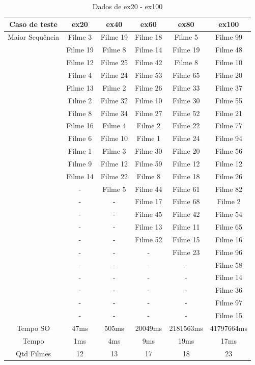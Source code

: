 \documentclass[12pt]{article}
\begin{document}
\begin{table}[H]

\centering

\begin{tabular}{|c|c|c|c|c|c|}

\hline
Caso de teste & ex20 & ex40 & ex60 & ex80 & ex100 \\
\hline
Maior Sequência & Filme 3 & Filme 19 & Filme 18 & Filme 5 & Filme 99 \\
\cline{2-6}
& Filme 19 & Filme 8 & Filme 14 & Filme 19 & Filme 48\\
\cline{2-6}
& Filme 12 & Filme 25 & Filme 42 & Filme 8 & Filme 10\\
\cline{2-6}
& Filme 4 & Filme 24 & Filme 53 & Filme 65 & Filme 20\\
\cline{2-6}
& Filme 13 & Filme 2 & Filme 26 & Filme 33 & Filme 37\\
\cline{2-6}
& Filme 2 & Filme 32 & Filme 10 & Filme 30 & Filme 55\\
\cline{2-6}
& Filme 8 & Filme 34 & Filme 27 & Filme 52 & Filme 21\\
\cline{2-6}
& Filme 16 & Filme 4 & Filme 2 & Filme 22 & Filme 77\\
\cline{2-6}
& Filme 6 & Filme 10 & Filme 1 & Filme 24 & Filme 94\\
\cline{2-6}
& Filme 1 & Filme 3 & Filme 30 & Filme 20 & Filme 56\\
\cline{2-6}
& Filme 9 & Filme 12 & Filme 59 & Filme 12 & Filme 12\\
\cline{2-6}
& Filme 14 & Filme 22 & Filme 8 & Filme 18 & Filme 26\\
\cline{2-6}
& - & Filme 5 & Filme 44 & Filme 61 & Filme 82\\
\cline{2-6}
& - & - & Filme 17 & Filme 68 & Filme 2\\
\cline{2-6}
& - & - & Filme 45 & Filme 42 & Filme 54\\
\cline{2-6}
& - & - & Filme 13 & Filme 11 & Filme 65\\
\cline{2-6}
& - & - & Filme 52 & Filme 15 & Filme 16\\
\cline{2-6}
& - & - & - & Filme 23 & Filme 96\\
\cline{2-6}
& - & - & - & - & Filme 58\\
\cline{2-6}
& - & - & - & - & Filme 14\\
\cline{2-6}
& - & - & - & - & Filme 36\\
\cline{2-6}
& - & - & - & - & Filme 97\\
\cline{2-6}
& - & - & - & - & Filme 15\\
\hline
Tempo SO & 47ms & 505ms & 20049ms & 2181563ms & 41797664ms\\
\hline
Tempo & 1ms & 4ms & 9ms & 19ms & 17ms\\
\hline
Qtd Filmes & 12 & 13 & 17 & 18 & 23\\
\hline

\end{tabular}
\label{Tabela1}
\caption{Dados de ex20 - ex100}

\end{table}
\end{document}
